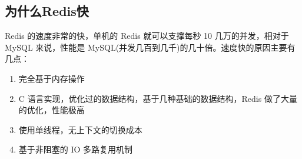 \documentclass[../../../interview-questions.tex]{subfiles}
\begin{document}
\subsection{为什么Redis快}

Redis 的速度非常的快，单机的 Redis 就可以支撑每秒 10 几万的并发，相对于 MySQL 来说，性能是 MySQL(并发几百到几千)的几十倍。速度快的原因主要有几点：

\begin{enumerate}
    \item {完全基于内存操作}
    \item {C 语言实现，优化过的数据结构，基于几种基础的数据结构，Redis 做了大量的优化，性能极高}
    \item {使用单线程，无上下文的切换成本}
    \item {基于非阻塞的 IO 多路复用机制}
\end{enumerate}
\end{document}
